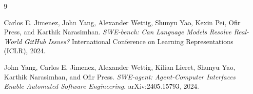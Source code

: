 \documentclass{article}
\begin{document}

\begin{thebibliography}{9}

Carlos E. Jimenez, John Yang, Alexander Wettig, Shunyu Yao, Kexin Pei,
Ofir Press, and Karthik Narasimhan.
\textit{SWE-bench: Can Language Models Resolve Real-World GitHub Issues?}
International Conference on Learning Representations (ICLR), 2024.

John Yang, Carlos E. Jimenez, Alexander Wettig, Kilian Lieret, Shunyu Yao,
Karthik Narasimhan, and Ofir Press.
\textit{SWE-agent: Agent-Computer Interfaces Enable Automated Software
Engineering.}
arXiv:2405.15793, 2024.

\end{thebibliography}
\end{document}
